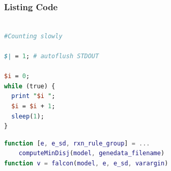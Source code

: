 \documentclass[compress]{beamer}
\begin{document}
\begin{frame}[fragile]
\frametitle{Listing Code}

{\color{gray!65}

{
\begin{lstlisting}[basicstyle=\ttfamily\tiny, language=perl, showstringspaces=false]

#Counting slowly

$| = 1; # autoflush STDOUT

$i = 0;
while (true) {
  print "$i ";
  $i = $i + 1;
  sleep(1);
}
\end{lstlisting}}

\vspace{4ex}

{
\begin{lstlisting}[basicstyle=\ttfamily\tiny, language=MATLAB, showstringspaces=false]
function [e, e_sd, rxn_rule_group] = ...
    computeMinDisj(model, genedata_filename)
function v = falcon(model, e, e_sd, varargin)
\end{lstlisting}}

} %

\end{frame}


\end{document}
